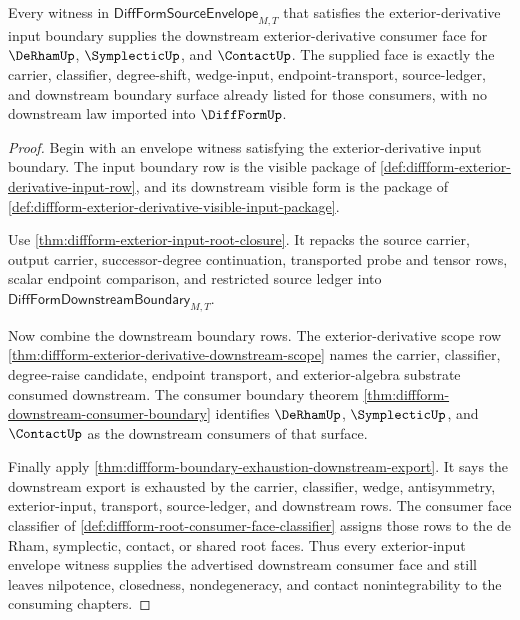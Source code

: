 \begin{theorem}
\label{thm:diffform-exterior-derivative-consumer-coverage}
Every witness in $\mathsf{DiffFormSourceEnvelope}_{M,T}$ that satisfies the
exterior-derivative input boundary supplies the downstream exterior-derivative
consumer face for $\DeRhamUp$, $\SymplecticUp$, and $\ContactUp$. The supplied
face is exactly the carrier, classifier, degree-shift, wedge-input,
endpoint-transport, source-ledger, and downstream boundary surface already
listed for those consumers, with no downstream law imported into
$\DiffFormUp$.
\end{theorem}
\begin{proof}
Begin with an envelope witness satisfying the exterior-derivative input
boundary. The input boundary row is the visible package of
\autoref{def:diffform-exterior-derivative-input-row}, and its downstream
visible form is the package of
\autoref{def:diffform-exterior-derivative-visible-input-package}.

Use \autoref{thm:diffform-exterior-input-root-closure}. It repacks the source
carrier, output carrier, successor-degree continuation, transported probe and
tensor rows, scalar endpoint comparison, and restricted source ledger into
$\mathsf{DiffFormDownstreamBoundary}_{M,T}$.

Now combine the downstream boundary rows. The exterior-derivative scope row
\autoref{thm:diffform-exterior-derivative-downstream-scope} names the carrier,
classifier, degree-raise candidate, endpoint transport, and exterior-algebra
substrate consumed downstream. The consumer boundary theorem
\autoref{thm:diffform-downstream-consumer-boundary} identifies
$\DeRhamUp$, $\SymplecticUp$, and $\ContactUp$ as the downstream consumers of
that surface.

Finally apply
\autoref{thm:diffform-boundary-exhaustion-downstream-export}. It says the
downstream export is exhausted by the carrier, classifier, wedge,
antisymmetry, exterior-input, transport, source-ledger, and downstream rows.
The consumer face classifier of
\autoref{def:diffform-root-consumer-face-classifier} assigns those rows to the
de Rham, symplectic, contact, or shared root faces. Thus every exterior-input
envelope witness supplies the advertised downstream consumer face and still
leaves nilpotence, closedness, nondegeneracy, and contact nonintegrability to
the consuming chapters.
\end{proof}
